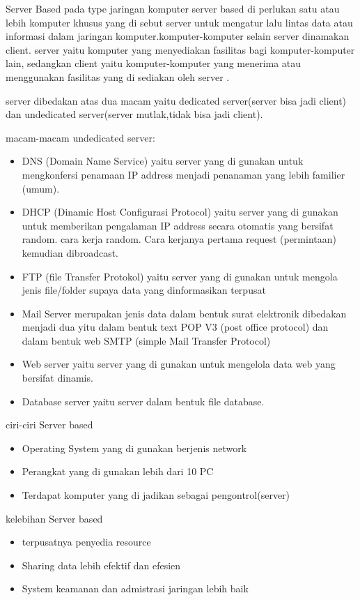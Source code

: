 Server Based
pada type jaringan komputer server based di perlukan satu atau lebih komputer khusus yang di sebut server untuk mengatur lalu lintas data atau informasi dalam jaringan komputer.komputer-komputer selain server dinamakan client. server yaitu komputer yang menyediakan fasilitas bagi komputer-komputer lain, sedangkan client yaitu komputer-komputer yang menerima atau menggunakan fasilitas yang di sediakan oleh server \cite{yudianto2007jaringan}.

server dibedakan atas dua macam yaitu dedicated server(server bisa jadi client) dan undedicated server(server mutlak,tidak bisa jadi client).

macam-macam undedicated server:
\begin{itemize}
  \item DNS (Domain Name Service) yaitu server yang di gunakan untuk mengkonfersi penamaan IP address menjadi penanaman yang lebih familier (umum).
  \item DHCP (Dinamic Host Configurasi Protocol) yaitu server yang di gunakan untuk memberikan pengalaman IP address secara otomatis yang bersifat random. cara kerja random. Cara kerjanya pertama request (permintaan) kemudian dibroadcast.
  \item  FTP (file Transfer Protokol) yaitu server yang di gunakan untuk mengola jenis file/folder supaya data yang dinformasikan terpusat
  \item Mail Server merupakan jenis data dalam bentuk surat elektronik dibedakan menjadi dua yitu dalam bentuk text POP V3 (post office protocol) dan dalam bentuk web SMTP (simple Mail Transfer Protocol)
  \item Web server yaitu server yang di gunakan untuk mengelola data web yang bersifat dinamis.
  \item Database server yaitu server dalam bentuk file database.
\end{itemize}

ciri-ciri Server based
\begin{itemize}
  \item Operating System yang di gunakan berjenis network
  \item Perangkat yang di gunakan lebih dari 10 PC
  \item Terdapat komputer yang di jadikan sebagai pengontrol(server)\cite{wahyono2007building}
\end{itemize}

kelebihan Server based
\begin{itemize}
  \item terpusatnya penyedia resource
  \item Sharing data lebih efektif dan efesien
  \item System keamanan dan admistrasi jaringan lebih baik
\end{itemize}

